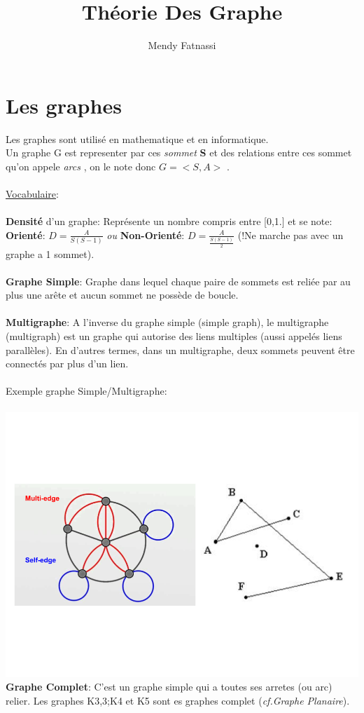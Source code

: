 \documentclass[a4paper,12pt,openany]{book}
\author{Mendy Fatnassi}
\title{Théorie Des Graphe}
\begin{document}
\maketitle
\tableofcontents

\chapter{Les graphes}

Les graphes sont utilisé en mathematique et en informatique.\\
Un graphe G est representer par ces \emph{sommet} \textbf{S} et  des relations entre ces sommet qu'on appele \emph{arcs} , on le note donc $G=<S,A>$ .\\
\\
\underline{Vocabulaire}:\\
\\
\textbf{Densité} d'un graphe: Représente un nombre compris entre [0,1.] et se note:\\
\textbf{Orienté}: $D=\frac{A}{S(S-1)}$ \emph{ou} \textbf{Non-Orienté}: $D=\frac{A}{\frac{S(S-1)}{2}}$ (!Ne marche pas avec un graphe a 1 sommet).\\
\\
\textbf{Graphe Simple}: Graphe dans lequel chaque paire de sommets est reliée par au plus une arête et aucun sommet ne possède de boucle.\\
\\
\textbf{Multigraphe}: A l'inverse du graphe simple (simple graph), le multigraphe (multigraph) est un graphe qui autorise des liens multiples (aussi appelés liens parallèles). En d'autres termes, dans un multigraphe, deux sommets peuvent être connectés par plus d'un lien.\\
\\
\newpage
Exemple graphe Simple/Multigraphe:\\
\\
\includegraphics[width=0.5\linewidth,center]{img/simple-multigraphe.png}
\\
\textbf{Graphe Complet}: C'est un graphe simple qui a toutes ses arretes (ou arc) relier. Les graphes K3,3;K4 et K5 sont es graphes complet (\emph{cf.Graphe Planaire}).\\
\end{document}
